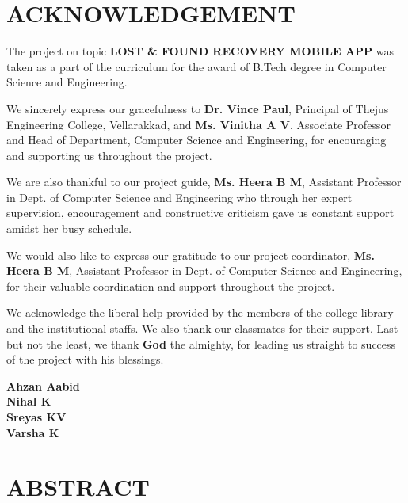 \documentclass[12pt,a4paper]{report}
\begin{document}
\newpage
\setcounter{page}{1}
\chapter*{ACKNOWLEDGEMENT}
{}

The project on topic \textbf{LOST \& FOUND RECOVERY MOBILE APP} was taken as a part of the curriculum for the award of B.Tech degree in Computer Science and Engineering.

We sincerely express our gracefulness to \textbf{Dr. Vince Paul}, Principal of Thejus Engineering College, Vellarakkad, and \textbf{Ms. Vinitha A V}, Associate Professor and Head of Department, Computer Science and Engineering, for encouraging and supporting us throughout the project.

We are also thankful to our project guide, \textbf{Ms. Heera B M}, Assistant Professor in Dept. of Computer Science and Engineering who through her expert supervision, encouragement and constructive criticism gave us constant support amidst her busy schedule.

We would also like to express our gratitude to our project coordinator, \textbf{Ms. Heera B M}, Assistant Professor in Dept. of Computer Science and Engineering, for their valuable coordination and support throughout the project.

We acknowledge the liberal help provided by the members of the college library and the institutional staffs. We also thank our classmates for their support. Last but not the least, we thank \textbf{God} the almighty, for leading us straight to success of the project with his blessings.

\vspace{0.5cm}

\begin{flushright}
\textbf{Ahzan Aabid}\\
\textbf{Nihal K}\\
\textbf{Sreyas KV}\\
\textbf{Varsha K}\\
\end{flushright}

\chapter*{ABSTRACT}
{}
\end{document}
